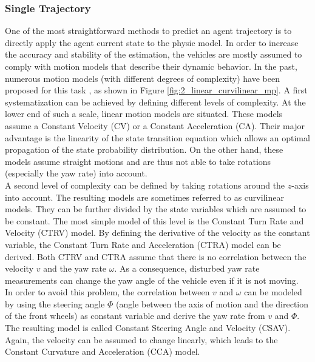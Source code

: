 \subsubsection{Single Trajectory}
\label{subsubsec:2_single_trajectory_mp}

One of the most straightforward methods to predict an agent trajectory is to directly apply the agent current state to the physic model. In order to increase the accuracy and stability of the estimation, the vehicles are mostly assumed to comply with motion models that describe their dynamic behavior. In the past, numerous motion models (with different degrees of complexity) have been proposed for this task \cite{miller2002adaptive, pepy2006reducing, hillenbrand2006multilevel}, as shown in Figure \ref{fig:2_linear_curvilinear_mp}. A first systematization can be achieved by defining different levels of complexity. At the lower end of such a scale, linear motion models are situated. These models assume a Constant Velocity (CV) or a Constant Acceleration (CA). Their major advantage is the linearity of the state transition equation which allows an optimal propagation of the state probability distribution. On the other hand, these models assume straight motions and are thus not able to take rotations (especially the yaw rate) into account. \\

A second level of complexity can be defined by taking rotations around the $z$-axis into account. The resulting models are sometimes referred to as curvilinear models. They can be further divided by the state variables which are assumed to be constant. The most simple model of this level is the Constant Turn Rate and Velocity (CTRV) model. By defining the derivative of the velocity as the constant variable, the Constant Turn Rate and Acceleration (CTRA) model can be derived. Both CTRV and CTRA assume that there is no correlation between the velocity $v$ and the yaw rate $\omega$. As a consequence, disturbed yaw rate measurements can change the yaw angle of the vehicle even if it is not moving. \\

In order to avoid this problem, the correlation between $v$ and $\omega$ can be modeled by using the steering angle $\Phi$ (angle between the axis of motion and the direction of the front wheels) as constant variable and derive the yaw rate from $v$ and $\Phi$. The resulting model is called Constant Steering Angle and Velocity (CSAV). Again, the velocity can be assumed to change linearly, which leads to the Constant Curvature and Acceleration (CCA) model. \\

